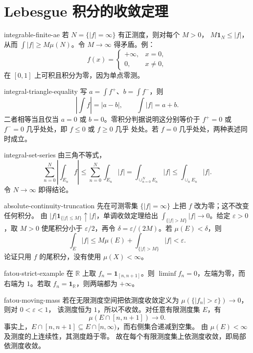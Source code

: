 \chapter{Lebesgue 积分的收敛定理}

\begin{solution}{integrable-finite-ae}
若 \(N=\{|f|=\infty\}\) 有正测度，则对每个 \(M>0\)，
\(M\mathbf1_N\le|f|\)，从而
\(\int|f|\ge M\mu(N)\)。令 \(M\to\infty\) 得矛盾。例：
\[
 f(x)=\begin{cases}+\infty,&x=0,\\0,&x\ne0,\end{cases}
\]
在 \([0,1]\) 上可积且积分为零，因为单点零测。
\end{solution}

\begin{solution}{integral-triangle-equality}
写 \(a=\int f^+\)、\(b=\int f^-\)，则
\[
 \left|\int f\right|=|a-b|,\qquad \int|f|=a+b.
\]
二者相等当且仅当 \(a=0\) 或 \(b=0\)。零积分判据说明这分别等价于
\(f^+=0\) 或 \(f^-=0\) 几乎处处，即 \(f\le0\) 或 \(f\ge0\) 几乎
处处。若 \(f=0\) 几乎处处，两种表述同时成立。
\end{solution}

\begin{solution}{integral-set-series}
由三角不等式，
\[
 \sum_{n=0}^{N}\left|\int_{E_n}f\right|
 \le\sum_{n=0}^{N}\int_{E_n}|f|
 =\int_{\cup_{n=0}^{N}E_n}|f|
 \le\int_{\cup_nE_n}|f|.
\]
令 \(N\to\infty\) 即得结论。
\end{solution}

\begin{solution}{absolute-continuity-truncation}
先在可测零集 \(\{|f|=\infty\}\) 上把 \(f\) 改为零；这不改变任何积分。
由 \(|f|\mathbf1_{\{|f|\le M\}}\uparrow|f|\)，单调收敛定理给出
\(\int_{\{|f|>M\}}|f|\to0\)。给定 \(\varepsilon>0\)，取 \(M>0\)
使尾积分小于 \(\varepsilon/2\)，再令
\(\delta=\varepsilon/(2M)\)。若 \(\mu(E)<\delta\)，则
\[
 \int_E|f|\le M\mu(E)+\int_{\{|f|>M\}}|f|<\varepsilon.
\]
论证只用 \(f\) 的尾积分，没有使用 \(\mu(X)<\infty\)。
\end{solution}

\begin{solution}{fatou-strict-example}
在 \(\mathbb R\) 上取 \(f_n=\mathbf1_{[n,n+1]}\)。则
\(\liminf f_n=0\)，左端为零，而右端为 \(1\)。若取
\(f_n=\mathbf1_{\mathbb R}\)，则两端都为 \(+\infty\)。
\end{solution}

\begin{solution}{fatou-moving-mass}
若在无限测度空间把依测度收敛定义为
\(\mu(\{|f_n|>\varepsilon\})\to0\)，则对 \(0<\varepsilon<1\)，
该测度恒为 \(1\)，所以不收敛。对任意有限测度集 \(E\)，有
\[
 \mu(E\cap[n,n+1])\longrightarrow0.
\]
事实上，\(E\cap[n,n+1]\subseteq E\cap[n,\infty)\)，而右侧集合递减到空集。
由 \(\mu(E)<\infty\) 及测度的上连续性，其测度趋于零。
故在每个有限测度集上依测度收敛，即局部依测度收敛。
\end{solution}

